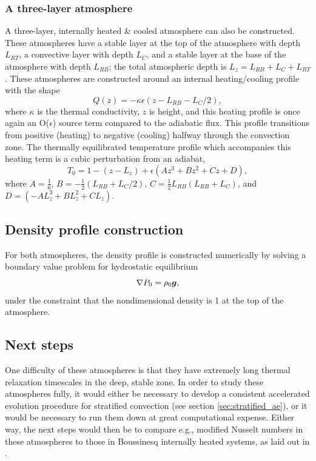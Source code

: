 \subsubsection{A three-layer atmosphere}
A three-layer, internally heated \& cooled atmosphere can also be constructed.
These atmospheres have a stable layer at the top of the atmosphere with depth $L_{RT}$, a convective layer with depth $L_C$, and a stable layer at the base of the atmosphere with depth $L_{RB}$; the total atmospheric depth is $L_z = L_{RB} + L_C + L_{RT}$.
These atmospheres are constructed around an internal heating/cooling profile with the shape
\begin{equation}
Q(z) = -\kappa \epsilon(z - L_{RB} - L_C/2),
\end{equation}
where $\kappa$ is the thermal conductivity, $z$ is height, and this heating profile is once again an O($\epsilon$) source term compared to the adiabatic flux.
This profile transitions from positive (heating) to negative (cooling) halfway through the convection zone.
The thermally equilibrated temperature profile which accompanies this heating term is a cubic perturbation from an adiabat,
\begin{equation}
T_0 = 1 - (z - L_z) + \epsilon(A z^3 + B z^2 + Cz + D),
\end{equation}
where $A = \frac{1}{6}$, $B = -\frac{1}{2}(L_{RB} + L_C/2)$, $C = \frac{1}{2}L_{RB}(L_{RB} + L_C)$, and $D = (-AL_z^3 + BL_z^2 + CL_z)$.

\subsection{Density profile construction}
For both atmospheres, the density profile is constructed numerically by solving a boundary value problem for hydrostatic equilibrium
\begin{equation}
\nabla P_0 = \rho_0 \bm{g},
\end{equation}
under the constraint that the nondimensional density is 1 at the top of the atmosphere.

\subsection{Next steps}
One difficulty of these atmospheres is that they have extremely long thermal relaxation timescales in the deep, stable zone.
In order to study these atmospheres fully, it would either be necessary to develop a consistent accelerated evolution procedure for stratified convection (see section \ref{sec:stratified_ae}), or it would be necessary to run them down at great computational expense.
Either way, the next steps would then be to compare e.g., modified Nusselt numbers in these atmospheres to those in Boussinesq internally heated systems, as laid out in \citet{goluskin2016}.


